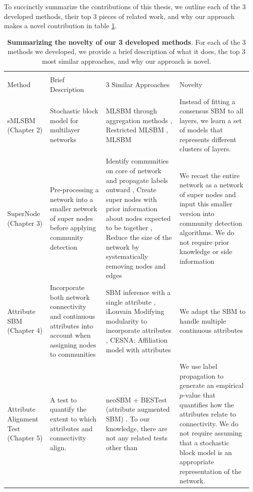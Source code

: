  To succinctly summarize the contributions of this thesis, we outline each of the 3 developed methods, their top 3 pieces of related work, and why our approach makes a novel contribution in table \ref{Tab11}. 
\begin{table}[h!]
\tiny
\begin{tabular}{ p{3cm}||p{3cm}|p{3cm}|p{3cm} }
 \multicolumn{4}{c}{} \\
 Method& Brief Description & 3 Similar Approaches & Novelty\\
 \hline
sMLSBM (Chapter 2)   & Stochastic block model for multilayer networks  & MLSBM through aggregation methods \cite{catala}, Restricted MLSBM \cite{mlsbm1},  MLSBM \cite{airoldi} & Instead of fitting a consensus SBM to all layers, we learn a set of models that represents different clusters of layers.\\
\hline
SuperNode (Chapter 3) &  Pre-processing a network into a smaller network of super nodes before applying community detection  & Identify communities on core of network and propagate labels outward \cite{peng}, Create super nodes with prior information about nodes expected to be together \cite{SuperNodeSide}, Reduce the size of the network by systematically removing nodes and edges \cite{gilbert}  & We recast the entire network as a network of super nodes and input this smaller version into community detection algorithms. We do not require prior knowledge or side information\\
\hline
Attribute SBM (Chapter 4) & Incorporate both network connectivity and continuous attributes into account when assigning nodes to communities  & SBM inference with a single attribute \cite{clauset}, iLouvain Modifying modularity to incorporate attributes \cite{ilouvain}, CESNA: Affiliation model with attributes \cite{cesna} & We adapt the SBM to handle multiple continuous attributes\\
 \hline
Attribute Alignment Test (Chapter 5) & A test to quantify the extent to which attributes and connectivity align.  & neoSBM + BESTest (attribute augmented SBM) \cite{peel2017ground}. To our knowledge, there are not any related tests other than \cite{peel2017ground} & We use label propagation to generate an empirical $p$-value that quantifies how the attributes relate to connectivity. We do not require assuming that a stochastic block model is an appropriate representation of the network.\\
\hline
\end{tabular}
\caption{{\bf Summarizing the novelty of our 3 developed methods}. For each of the 3 methods we developed, we provide a brief description of what it does, the top 3 most similar approaches, and why our approach is novel.}
\label{Tab11}
\end{table}
